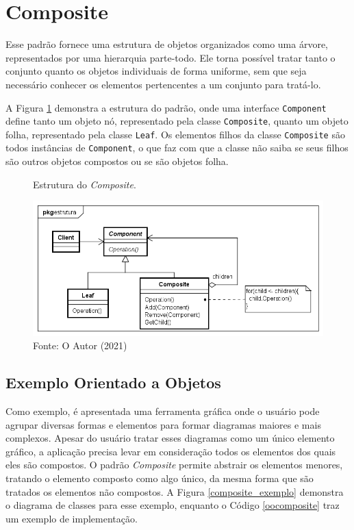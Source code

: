 \section{Composite}

Esse padrão fornece uma estrutura de objetos 
organizados como uma árvore, representados 
por uma hierarquia parte-todo. 
Ele torna possível tratar tanto o conjunto 
quanto os objetos individuais de forma 
uniforme, sem que seja necessário conhecer 
os elementos pertencentes a um conjunto para 
tratá-lo.\cite{gamma:1995}

A Figura \ref{composite_struct} demonstra a 
estrutura do padrão, onde uma interface \texttt{Component} 
define tanto um objeto nó, representado pela 
classe \texttt{Composite}, quanto um objeto folha, 
representado pela classe \texttt{Leaf}. Os elementos 
filhos da classe \texttt{Composite} são todos instâncias 
de \texttt{Component}, o que faz com que a classe não 
saiba se seus filhos são outros objetos compostos 
ou se são objetos folha.

\begin{figure}[htb]
	\caption{\label{composite_struct}Estrutura do \textit{Composite}.}
	\begin{center}
	    \includegraphics[scale=0.5]{5_padroes-contexto-funcional/5.2_estruturais/5.2.3_composite/composite_estrutura.png}
	\end{center}
  \caption*{Fonte: O Autor (2021)}
\end{figure}

\subsection*{Exemplo Orientado a Objetos}

Como exemplo, é apresentada uma ferramenta gráfica 
onde o usuário pode agrupar diversas formas e 
elementos 
para formar diagramas maiores e mais complexos. 
Apesar do usuário tratar esses diagramas como um 
único elemento gráfico, a aplicação precisa levar 
em consideração todos os elementos dos quais eles 
são compostos. O padrão \textit{Composite} permite 
abstrair os elementos menores, tratando o elemento 
composto como algo único, da mesma forma que 
são tratados os elementos não compostos. A Figura 
\ref{composite_exemplo} demonstra o diagrama de 
classes para esse exemplo, enquanto o Código 
\ref{oocomposite} traz um exemplo de implementação.

